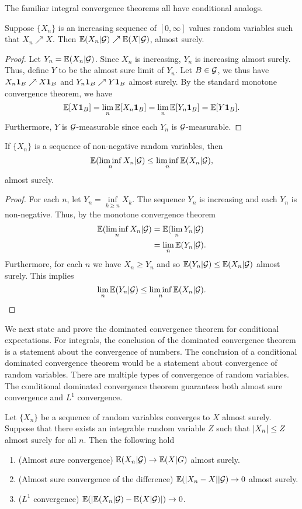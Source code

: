 The familiar integral convergence theorems all have conditional analogs. 
\begin{proposition}
    Suppose $\{X_n\}$ is an increasing sequence of $[0,\infty]$ values random variables such that $X_n \nearrow X$. Then ${\mathbb{E}}(X_n|{\mathcal{G}}) \nearrow {\mathbb{E}}(X|{\mathcal{G}})$, almost surely.
\end{proposition}
\begin{proof}
    Let $Y_n = {\mathbb{E}}(X_n|{\mathcal{G}})$. Since $X_n$ is increasing, $Y_n$ is increasing almost surely. Thus, define $Y$ to be the almost sure limit of $Y_n$. Let $B \in {\mathcal{G}}$, we thus have $X_n {{\bf 1}}_B \nearrow X {{\bf 1}}_B$ and $Y_n {{\bf 1}}_B \nearrow Y{{\bf 1}}_B$ almost surely. By the standard monotone convergence theorem, we have
    \[{\mathbb{E}}[X{{\bf 1}}_B] = \lim_n {\mathbb{E}}[X_n {{\bf 1}}_B] = \lim_n {\mathbb{E}}[Y_n {{\bf 1}}_B] = {\mathbb{E}}[Y{{\bf 1}}_B].  \]
    Furthermore, $Y$ is ${\mathcal{G}}$-measurable since each $Y_n$ is ${\mathcal{G}}$-measurable.
\end{proof}
\begin{proposition}
    If $\{X_n\}$ is a sequence of non-negative random variables, then 
    \[{\mathbb{E}}(\liminf_n X_n |{\mathcal{G}}) \le \liminf_n {\mathbb{E}}(X_n|{\mathcal{G}}), \]
    almost surely.
\end{proposition}
\begin{proof}
    For each $n$,  let $Y_n = \inf\limits_{k \ge n}X_k$. The sequence $Y_n$ is increasing and each $Y_n$ is non-negative. Thus, by the monotone convergence theorem
    \begin{align*}
        {\mathbb{E}}(\liminf_n X_n|{\mathcal{G}})&={\mathbb{E}}(\lim_n Y_n|{\mathcal{G}})\\
        &=\lim_n {\mathbb{E}}(Y_n|{\mathcal{G}}).
    \end{align*}
    Furthermore, for each $n$ we have $X_n \ge Y_n$ and so ${\mathbb{E}}(Y_n|{\mathcal{G}}) \le {\mathbb{E}}(X_n|{\mathcal{G}})$ almost surely. This implies
    \[\lim_n {\mathbb{E}}(Y_n|{\mathcal{G}}) \le \liminf_n {\mathbb{E}}(X_n |{\mathcal{G}}).\qedhere  \]
\end{proof}
We next state and prove the dominated convergence theorem for conditional expectations. For integrals, the conclusion of the dominated convergence theorem is a statement about the convergence of numbers. The conclusion of a conditional dominated convergence theorem would be a statement about convergence of random variables. There are multiple types of convergence of random variables. The conditional dominated convergence theorem guarantees both almost sure convergence and $L^1$ convergence.
\begin{proposition}
    Let $\{X_n\}$ be a sequence of random variables converges to $X$ almost surely. Suppose that there exists an integrable random variable $Z$ such that ${\left\lvert X_n\right\rvert} \le Z$ almost surely for all $n$. Then the following hold
    \begin{enumerate}
        \item (Almost sure convergence) ${\mathbb{E}}(X_n|{\mathcal{G}}) \to {\mathbb{E}}(X|G)$ almost surely.
        \item (Almost sure convergence of the difference) ${\mathbb{E}}({\left\lvert X_n-X\right\rvert}|{\mathcal{G}}) \to 0$ almost surely.
        \item ($L^1$ convergence) ${\mathbb{E}}({\left\lvert{\mathbb{E}}(X_n|{\mathcal{G}})-{\mathbb{E}}(X|{\mathcal{G}})\right\rvert}) \to 0$. 
    \end{enumerate}
\end{proposition}
